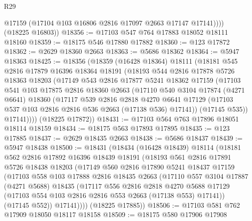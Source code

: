 \begin{lexlean}{R29}
\begin{coremodule}
            @17159
            (@17104 @103 @16806 @2816 @17097 @2663 @17147 @17141))))
      (@18225 @16803))
@18356 := @17103 @547 @764 @17883 @18052 @18111 @18160
@18359 := @18175 @546 @17880 @17882
@18360 := @123 @17872
@18362 := @2629 @18360 @2663
@18363 := @5686 @18362
@18364 := @5947 @18363
@18425 := @18356
    (@18359
      (@16428 @18364)
      @18111
      (@18181
        @545
        @2816
        @17879
        @16396
        @18364
        @18191
        (@18193
          @544
          @2816
          @17878
          @5726
          @18363
          @18203
          (@17149
            @543
            @2816
            @17877
            @5241
            @18362
            @17159
            (@17103
              @541
              @103
              @17875
              @2816
              @18360
              @2663
              (@17110
                @540
                @3104
                @17874
                (@4271 @6641)
                @18360
                (@17117
                  @539
                  @2816
                  @2818
                  @4270
                  @6641
                  @17129
                  (@17103 @537 @103 @2816 @2816 @536 @2663 (@17138 @536) @17141))
                (@17145 @535))
              @17141))))
      (@18225 @17872))
@18431 := @17103 @564 @763 @17896 @18051 @18114 @18159
@18434 := @18175 @563 @17893 @17895
@18435 := @123 @17885
@18437 := @2629 @18435 @2663
@18438 := @5686 @18437
@18439 := @5947 @18438
@18500 := @18431
    (@18434
      (@16428 @18439)
      @18114
      (@18181
        @562
        @2816
        @17892
        @16396
        @18439
        @18191
        (@18193
          @561
          @2816
          @17891
          @5726
          @18438
          @18203
          (@17149
            @560
            @2816
            @17890
            @5241
            @18437
            @17159
            (@17103
              @558
              @103
              @17888
              @2816
              @18435
              @2663
              (@17110
                @557
                @3104
                @17887
                (@4271 @5688)
                @18435
                (@17117
                  @556
                  @2816
                  @2818
                  @4270
                  @5688
                  @17129
                  (@17103 @554 @103 @2816 @2816 @553 @2663 (@17138 @553) @17141))
                (@17145 @552))
              @17141))))
      (@18225 @17885))
@18506 := @17103 @581 @762 @17909 @18050 @18117 @18158
@18509 := @18175 @580 @17906 @17908

\end{coremodule}
\end{lexlean}
